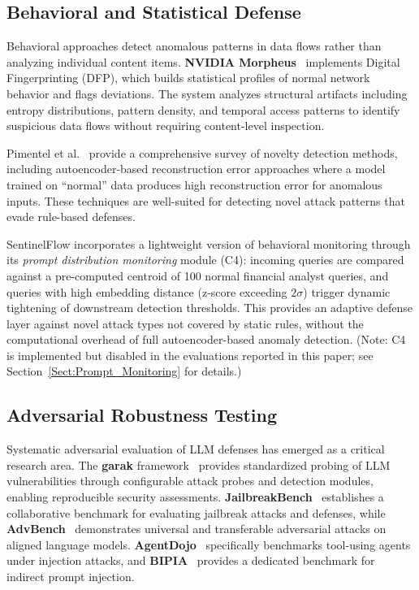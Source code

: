 \documentclass[journal]{IEEEtran}
\begin{document}
\subsection{Behavioral and Statistical Defense}
\label{Sect:LR_Behavioral}

Behavioral approaches detect anomalous patterns in data flows rather than analyzing individual content items. \textbf{NVIDIA Morpheus}~\cite{nvidia_morpheus} implements Digital Fingerprinting (DFP), which builds statistical profiles of normal network behavior and flags deviations. The system analyzes structural artifacts including entropy distributions, pattern density, and temporal access patterns to identify suspicious data flows without requiring content-level inspection.

Pimentel et al.~\cite{pimentel_novelty} provide a comprehensive survey of novelty detection methods, including autoencoder-based reconstruction error approaches where a model trained on ``normal'' data produces high reconstruction error for anomalous inputs. These techniques are well-suited for detecting novel attack patterns that evade rule-based defenses.

SentinelFlow incorporates a lightweight version of behavioral monitoring through its \textit{prompt distribution monitoring} module (C4): incoming queries are compared against a pre-computed centroid of 100 normal financial analyst queries, and queries with high embedding distance (z-score exceeding $2\sigma$) trigger dynamic tightening of downstream detection thresholds. This provides an adaptive defense layer against novel attack types not covered by static rules, without the computational overhead of full autoencoder-based anomaly detection. (Note: C4 is implemented but disabled in the evaluations reported in this paper; see Section~\ref{Sect:Prompt_Monitoring} for details.)

\subsection{Adversarial Robustness Testing}
\label{Sect:LR_Adversarial}

Systematic adversarial evaluation of LLM defenses has emerged as a critical research area. The \textbf{garak} framework~\cite{garak_paper, garak_github} provides standardized probing of LLM vulnerabilities through configurable attack probes and detection modules, enabling reproducible security assessments. \textbf{JailbreakBench}~\cite{jailbreakbench} establishes a collaborative benchmark for evaluating jailbreak attacks and defenses, while \textbf{AdvBench}~\cite{advbench} demonstrates universal and transferable adversarial attacks on aligned language models. \textbf{AgentDojo}~\cite{agentdojo} specifically benchmarks tool-using agents under injection attacks, and \textbf{BIPIA}~\cite{bipia} provides a dedicated benchmark for indirect prompt injection.
\end{document}
